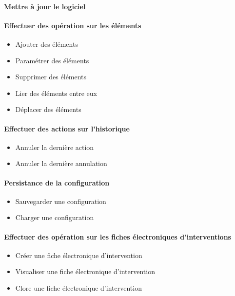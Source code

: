 {
	\paragraph{ Mettre à jour le logiciel }
}
{
\paragraph{Effectuer des opération sur les éléments }
\begin{itemize}
	\item Ajouter des éléments
	\item Paramétrer des éléments
	\item Supprimer des éléments
	\item Lier des éléments entre eux
	\item Déplacer des éléments
\end{itemize}

\paragraph{Effectuer des actions sur l'historique}
\begin{itemize}
	\item Annuler la dernière action
	\item Annuler la dernière annulation
\end{itemize}

\paragraph{Persistance de la configuration}
\begin{itemize}
	\item Sauvegarder une configuration
	\item Charger une configuration
\end{itemize}

\paragraph{Effectuer des opération sur les fiches électroniques d'interventions}
\begin{itemize}
	\item Créer une fiche électronique d'intervention
	\item Visualiser une fiche électronique d'intervention
	\item Clore une fiche électronique d'intervention
\end{itemize}

}
